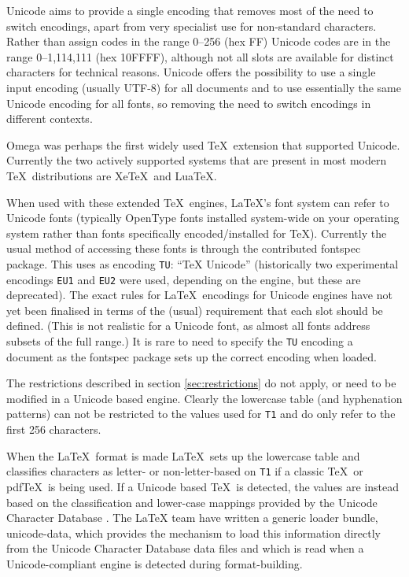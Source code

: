 \documentclass{ltxguide}[1994/11/20]
\providecommand{\Enc}[1]{\texttt{#1}}
\providecommand{\Pkg}[1]{%
  \textsf{#1}}
\begin{document}
Unicode aims to provide a single encoding that removes most of the
need to switch encodings, apart from very specialist use for non-standard characters. Rather than assign codes in the range 0--256 (hex
FF) Unicode codes are in the range 0--1,114,111 (hex 10FFFF), although
not all slots are available for distinct characters for technical
reasons. Unicode offers the possibility to use a single input encoding
(usually UTF-8) for all documents and to use essentially the same
Unicode encoding for all fonts, so removing the need to switch
encodings in different contexts.

Omega was perhaps the first widely used \TeX\ extension that
supported Unicode. Currently the two actively supported systems that are
present in most modern \TeX\ distributions are Xe\TeX\ and Lua\TeX.

When used with these extended \TeX\ engines, \LaTeX's font system can
refer to Unicode fonts (typically OpenType fonts installed system-wide
on your operating system rather than fonts specifically encoded/installed for
\TeX). Currently the usual method of accessing these fonts is through
the contributed \Pkg{fontspec} package. This uses as encoding \Enc{TU}:
``\TeX{} Unicode'' (historically two experimental encodings \Enc{EU1}
and \Enc{EU2}
were used, depending on the engine, but these are deprecated).
The exact rules for \LaTeX\ encodings
for Unicode engines have not yet been finalised in terms of the (usual)
requirement that each slot should be defined. (This is not realistic for
a Unicode font, as almost all fonts address subsets of the full range.)
It is rare to need to specify the \Enc{TU} encoding a document as the
\Pkg{fontspec} package sets up the correct encoding when loaded.

The restrictions described in section \ref{sec:restrictions} do not
apply, or need to be modified in a Unicode based engine. Clearly the
lowercase table (and hyphenation patterns) can not be restricted to
the values used for \Enc{T1} and do only refer to the first 256
characters.

When the \LaTeX\ format is made \LaTeX\ sets up the lowercase table
and classifies characters as letter- or non-letter-based on \Enc{T1} if
a classic \TeX\ or pdf\TeX\ is being used. If a Unicode based \TeX\ is
detected, the values are instead based on the classification and
lower-case mappings provided by the Unicode Character Database
\cite{ucd}. The \LaTeX{} team have written a generic loader bundle,
\Pkg{unicode-data}, which provides the mechanism to load this information
directly from the Unicode Character Database data files and which is read
when a Unicode-compliant engine is detected during format-building.
\end{document}
